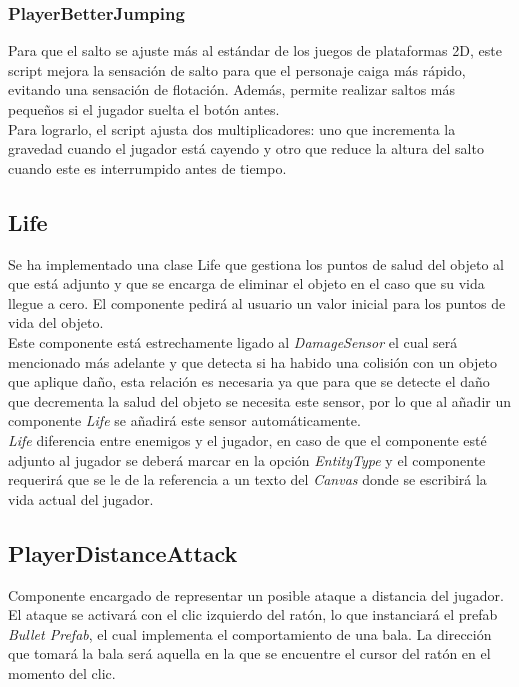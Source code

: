 \subsubsection{PlayerBetterJumping}

Para que el salto se ajuste más al estándar de los juegos de plataformas 2D, este script mejora la sensación de salto para que el personaje caiga más rápido, evitando una sensación de flotación. Además, permite realizar saltos más pequeños si el jugador suelta el botón antes.\\
Para lograrlo, el script ajusta dos multiplicadores: uno que incrementa la gravedad cuando el jugador está cayendo y otro que reduce la altura del salto cuando este es interrumpido antes de tiempo.\\

\subsection{Life}

Se ha implementado una clase Life que gestiona los puntos de salud del objeto al que está adjunto y que se encarga de eliminar el objeto en el caso que su vida llegue a cero. El componente pedirá al usuario un valor inicial para los puntos de vida del objeto.\\
Este componente está estrechamente ligado al \textit{DamageSensor} el cual será mencionado más adelante y que detecta si ha habido una colisión con un objeto que aplique daño, esta relación es necesaria ya que para que se detecte el daño que decrementa la salud del objeto se necesita este sensor, por lo que al añadir un componente \textit{Life} se añadirá este sensor automáticamente.\\
\textit{Life} diferencia entre enemigos y el jugador, en caso de que el componente esté adjunto al jugador se deberá marcar en la opción \textit{EntityType} y el componente requerirá que se le de la referencia a un texto del \textit{Canvas} donde se escribirá la vida actual del jugador.\\

\subsection{PlayerDistanceAttack}

Componente encargado de representar un posible ataque a distancia del jugador. El ataque se activará con el clic izquierdo del ratón, lo que instanciará el prefab \textit{Bullet Prefab}, el cual implementa el comportamiento de una bala. La dirección que tomará la bala será aquella en la que se encuentre el cursor del ratón en el momento del clic.

